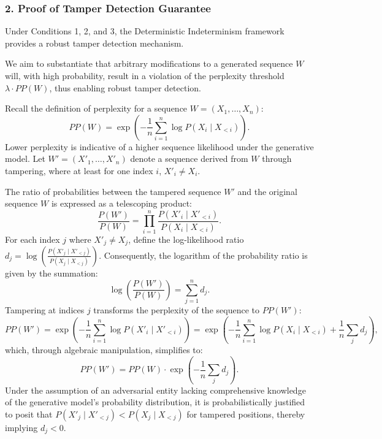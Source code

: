 \documentclass{article}
\begin{document}
\subsubsection*{2. Proof of Tamper Detection Guarantee}
Under Conditions 1, 2, and 3, the Deterministic Indeterminism framework provides a robust tamper detection mechanism.

We aim to substantiate that arbitrary modifications to a generated sequence \(W\) will, with high probability, result in a violation of the perplexity threshold \( \lambda \cdot PP(W) \), thus enabling robust tamper detection.

Recall the definition of perplexity for a sequence \(W = (X_1, \ldots, X_n)\):
\[
PP(W) = \exp\left(-\frac{1}{n}\sum_{i=1}^n \log P(X_i \mid X_{<i})\right).
\]
Lower perplexity is indicative of a higher sequence likelihood under the generative model. Let \(W' = (X'_1, \ldots, X'_n)\) denote a sequence derived from \(W\) through tampering, where at least for one index \(i\), \(X'_i \neq X_i\).

The ratio of probabilities between the tampered sequence \(W'\) and the original sequence \(W\) is expressed as a telescoping product:
\[
\frac{P(W')}{P(W)} = \prod_{i=1}^n \frac{P(X'_i \mid X'_{<i})}{P(X_i \mid X_{<i})}.
\]
For each index \(j\) where \(X'_j \neq X_j\), define the log-likelihood ratio \(d_j = \log\left(\frac{P(X'_j \mid X'_{<j})}{P(X_j \mid X_{<j})}\right)\). Consequently, the logarithm of the probability ratio is given by the summation:
\[
\log\left(\frac{P(W')}{P(W)}\right) = \sum_{j=1}^n d_j.
\]
Tampering at indices \(j\) transforms the perplexity of the sequence to \(PP(W')\):
\[
PP(W') = \exp\left(-\frac{1}{n}\sum_{i=1}^n \log P(X'_i \mid X'_{<i})\right) = \exp\left(-\frac{1}{n}\sum_{i=1}^n \log P(X_i \mid X_{<i}) + \frac{1}{n}\sum_{j} d_j \right),
\]
which, through algebraic manipulation, simplifies to:
\[
PP(W') = PP(W) \cdot \exp\left(-\frac{1}{n}\sum_{j} d_j\right).
\]
Under the assumption of an adversarial entity lacking comprehensive knowledge of the generative model's probability distribution, it is probabilistically justified to posit that \(P(X'_j \mid X'_{<j}) < P(X_j \mid X_{<j})\) for tampered positions, thereby implying \(d_j < 0\).
\end{document}
